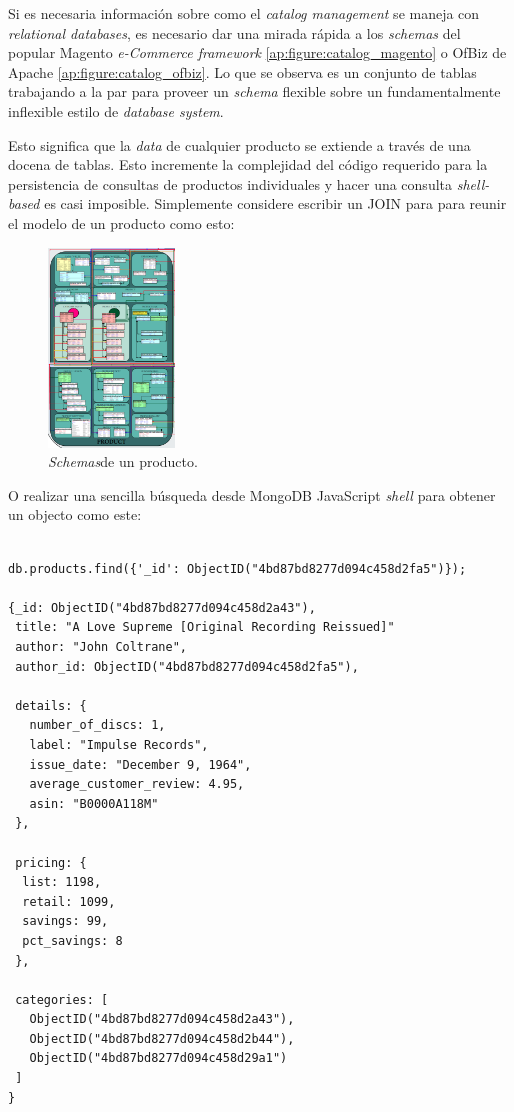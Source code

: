 Si es necesaria información sobre como el \textit{catalog management} se maneja con \textit{relational databases}, es necesario dar una mirada rápida a los \textit{schemas} del popular Magento \textit{e-Commerce framework} \ref{ap:figure:catalog_magento} o OfBiz de Apache \ref{ap:figure:catalog_ofbiz}. Lo que se observa es un conjunto de tablas trabajando a la par para proveer un \textit{schema} flexible sobre un fundamentalmente inflexible estilo de \textit{database system}.

Esto significa que la \textit{data} de cualquier producto se extiende a través de una docena de tablas. Esto incremente la complejidad del código requerido para la persistencia de consultas de productos individuales y hacer una consulta \textit{shell-based} es casi imposible. Simplemente considere escribir un  JOIN para para reunir el modelo de un producto como esto:

\begin{figure}[h!]
	\centering
	\includegraphics[width=0.3\textwidth]{figuras/cap2/magento_product_schema.png}
	\caption{\textit{Schemas}de un producto.}
	\label{cap:figure:catalog_magento}
\end{figure}

O realizar una sencilla búsqueda desde MongoDB JavaScript \textit{shell} para obtener un objecto  como este:

\medskip
\begin{lstlisting}[caption= Busqueda en MongoDB]

db.products.find({'_id': ObjectID("4bd87bd8277d094c458d2fa5")});

{_id: ObjectID("4bd87bd8277d094c458d2a43"),
 title: "A Love Supreme [Original Recording Reissued]"
 author: "John Coltrane",
 author_id: ObjectID("4bd87bd8277d094c458d2fa5"),

 details: {
   number_of_discs: 1,
   label: "Impulse Records",
   issue_date: "December 9, 1964",
   average_customer_review: 4.95,
   asin: "B0000A118M"
 },

 pricing: {
  list: 1198,
  retail: 1099,
  savings: 99,
  pct_savings: 8
 },

 categories: [
   ObjectID("4bd87bd8277d094c458d2a43"),
   ObjectID("4bd87bd8277d094c458d2b44"),
   ObjectID("4bd87bd8277d094c458d29a1")
 ]
}
\end{lstlisting}

